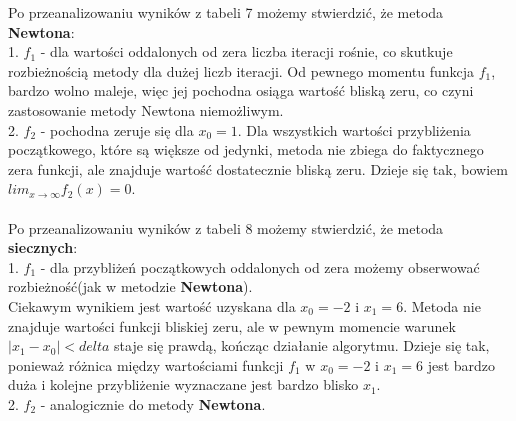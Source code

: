 \documentclass[10pt,a4paper, polish]{article}
\begin{document}
Po przeanalizowaniu wyników z tabeli 7 możemy stwierdzić, że metoda \textbf{Newtona}:\\
1. \textbf{$f_1$} - dla wartości oddalonych od zera liczba iteracji rośnie, co skutkuje rozbieżnością metody dla dużej liczb iteracji. Od pewnego momentu funkcja $f_1$, bardzo wolno maleje, więc jej pochodna osiąga wartość bliską zeru, co czyni zastosowanie metody Newtona niemożliwym.\\
2. \textbf{$f_2$} - pochodna zeruje się dla $x_0 = 1$. Dla wszystkich wartości przybliżenia początkowego, które są większe od jedynki, metoda nie zbiega do faktycznego zera funkcji, ale znajduje wartość dostatecznie bliską zeru. Dzieje się tak, bowiem $lim_{x \to \infty}f_2(x) = 0$. \\\\

Po przeanalizowaniu wyników z tabeli 8 możemy stwierdzić, że metoda \textbf{siecznych}:\\
1. \textbf{$f_1$} - dla przybliżeń początkowych oddalonych od zera możemy obserwować rozbieżność(jak w metodzie \textbf{Newtona}).\\ Ciekawym wynikiem jest wartość uzyskana dla $x_0 = -2$ i $x_1 = 6$. Metoda nie znajduje wartości funkcji bliskiej zeru, ale w pewnym momencie warunek $|x_1 - x_0| < delta$ staje się prawdą, kończąc działanie algorytmu. Dzieje się tak, ponieważ różnica między wartościami funkcji $f_1$ w $x_0 = -2$ i $x_1 = 6$ jest bardzo duża i kolejne przybliżenie wyznaczane jest bardzo blisko $x_1$.\\
2. \textbf{$f_2$} - analogicznie do metody \textbf{Newtona}.
\end{document}
